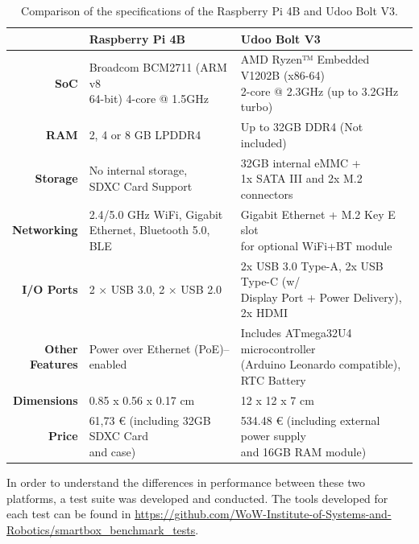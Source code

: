 \renewcommand{\arraystretch}{2}
\begin{table}[H]
    \centering
    \begin{tabular}{r|l|l}
        & \textbf{Raspberry Pi 4B}& \textbf{Udoo Bolt V3}  \\ \hline
        \textbf{SoC} &  \makecell{Broadcom BCM2711 (ARM v8 \\ 64-bit) 4-core @ 1.5GHz} & \makecell{AMD Ryzen™ Embedded V1202B (x86-64) \\ 2-core @ 2.3GHz (up to 3.2GHz turbo)}\\
        \textbf{RAM} & 2, 4 or 8 GB LPDDR4 & Up to 32GB DDR4 (Not included) \\ 
        \textbf{Storage} & \makecell{No internal storage, \\ SDXC Card Support} & \makecell{32GB internal eMMC + \\1x SATA III and 2x M.2 connectors}\\
        \textbf{Networking} & \makecell{2.4/5.0 GHz WiFi, Gigabit \\ Ethernet, Bluetooth 5.0, BLE} & \makecell{Gigabit Ethernet + M.2 Key E slot \\ for optional WiFi+BT module}\\ 
        \textbf{I/O Ports} & 2 × USB 3.0, 2 × USB 2.0 & \makecell{2x USB 3.0 Type-A, 2x USB Type-C (w/ \\ Display Port + Power Delivery), 2x HDMI} \\
        \makecell[r]{\textbf{Other} \\\textbf{Features}} & Power over Ethernet (PoE)–enabled & \makecell{Includes ATmega32U4 microcontroller\\ (Arduino Leonardo compatible), \\ RTC Battery} \\   
        \textbf{Dimensions} & 0.85 x 0.56 x 0.17 cm & 12 x 12 x 7 cm \\
        \textbf{Price} & \makecell{61,73 € (including 32GB SDXC Card\\ and case)} & \makecell{534.48 € (including external power supply\\ and 16GB RAM module)} \\
    \end{tabular}
    \caption{Comparison of the specifications of the Raspberry Pi 4B and Udoo Bolt V3.}
    \label{tab:comparsion-hardwareplatform}
\end{table}
\renewcommand{\arraystretch}{1}


In order to understand the differences in performance between these two platforms, a test suite was developed and conducted. The tools developed for each test can be found in \url{https://github.com/WoW-Institute-of-Systems-and-Robotics/smartbox_benchmark_tests}. 

